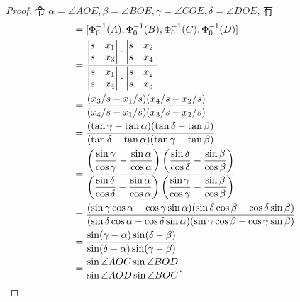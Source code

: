 \documentclass[color=black,device=normal,lang=cn,mode=geye]{elegantnote}
\begin{document}
\begin{proof}
    令 $\alpha=\angle AOE,\beta=\angle BOE,\gamma=\angle COE,\delta=\angle DOE$, 有
    \begin{align*}
        [A,B,C,D] & =[\Phi_0^{-1}(A),\Phi_0^{-1}(B),\Phi_0^{-1}(C),\Phi_0^{-1}(D)] \\
        & =\dfrac{\begin{vmatrix}
            s & x_1 \\
            s & x_3 \\
        \end{vmatrix}\cdot\begin{vmatrix}
            s & x_2 \\
            s & x_4 \\
        \end{vmatrix}}{\begin{vmatrix}
            s & x_1 \\
            s & x_4 \\
        \end{vmatrix}\cdot\begin{vmatrix}
            s & x_2 \\
            s & x_3 \\
        \end{vmatrix}} \\
        & =\dfrac{(x_3/s-x_1/s)(x_4/s-x_2/s)}{(x_4/s-x_1/s)(x_3/s-x_2/s)} \\
        & =\dfrac{(\tan\gamma-\tan\alpha)(\tan\delta-\tan\beta)}{(\tan\delta-\tan\alpha)(\tan\gamma-\tan\beta)} \\
        & =\dfrac{\left(\dfrac{\sin\gamma}{\cos\gamma}-\dfrac{\sin\alpha}{\cos\alpha}\right)\left(\dfrac{\sin\delta}{\cos\delta}-\dfrac{\sin\beta}{\cos\beta}\right)}{\left(\dfrac{\sin\delta}{\cos\delta}-\dfrac{\sin\alpha}{\cos\alpha}\right)\left(\dfrac{\sin\gamma}{\cos\gamma}-\dfrac{\sin\beta}{\cos\beta}\right)} \\
        & =\dfrac{(\sin\gamma\cos\alpha-\cos\gamma\sin\alpha)(\sin\delta\cos\beta-\cos\delta\sin\beta)}{(\sin\delta\cos\alpha-\cos\delta\sin\alpha)(\sin\gamma\cos\beta-\cos\gamma\sin\beta)} \\
        & =\dfrac{\sin(\gamma-\alpha)\sin(\delta-\beta)}{\sin(\delta-\alpha)\sin(\gamma-\beta)} \\
        & =\dfrac{\sin\angle AOC\sin\angle BOD}{\sin\angle AOD\sin\angle BOC}.\qedhere
    \end{align*}
\end{proof}
\end{document}
